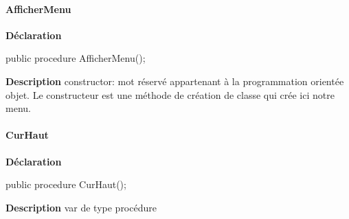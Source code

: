 \documentclass{report}
\newif\ifpdf
\begin{document}
\paragraph*{AfficherMenu}\hspace*{\fill}

\label{LesMenus.TMainMenu-AfficherMenu}
\begin{list}{}{
\setlength{\itemindent}{0cm}
\setlength{\listparindent}{0cm}
\setlength{\leftmargin}{\evensidemargin}
\addtolength{\leftmargin}{\tmplength}
\settowidth{\labelsep}{X}
\addtolength{\leftmargin}{\labelsep}
\setlength{\labelwidth}{\tmplength}
}
\item[\textbf{Déclaration}\hfill]
\ifpdf
\begin{flushleft}
\fi
\begin{ttfamily}
public procedure AfficherMenu();\end{ttfamily}

\ifpdf
\end{flushleft}
\fi

\par
\item[\textbf{Description}]
constructor: mot réservé appartenant à la programmation orientée objet. Le constructeur est une méthode de création de classe qui crée ici notre menu.

\end{list}
\paragraph*{CurHaut}\hspace*{\fill}

\label{LesMenus.TMainMenu-CurHaut}
\begin{list}{}{
\setlength{\itemindent}{0cm}
\setlength{\listparindent}{0cm}
\setlength{\leftmargin}{\evensidemargin}
\addtolength{\leftmargin}{\tmplength}
\settowidth{\labelsep}{X}
\addtolength{\leftmargin}{\labelsep}
\setlength{\labelwidth}{\tmplength}
}
\item[\textbf{Déclaration}\hfill]
\ifpdf
\begin{flushleft}
\fi
\begin{ttfamily}
public procedure CurHaut();\end{ttfamily}

\ifpdf
\end{flushleft}
\fi

\par
\item[\textbf{Description}]
var de type procédure

\end{list}
\end{document}
